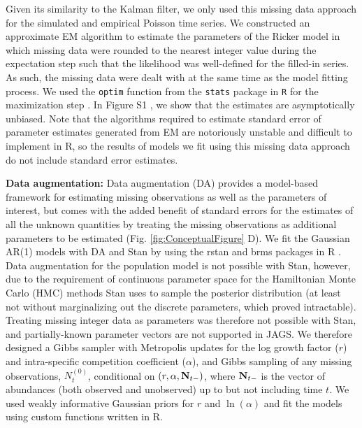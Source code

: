 \documentclass{article}
\begin{document}
Given its similarity to the Kalman filter, we only used this missing data approach for the simulated and empirical Poisson time series. We constructed an approximate EM algorithm to estimate the parameters of the Ricker model in which missing data were rounded to the nearest integer value during the expectation step such that the likelihood was well-defined for the filled-in series. As such, the missing data were dealt with at the same time as the model fitting process. We used the \texttt{optim} function from the \texttt{stats} package in \texttt{R} for the maximization step \citep{r_2021}. In Figure S1%
, we show that the estimates are asymptotically unbiased. Note that the algorithms required to estimate standard error of parameter estimates generated from EM are notoriously unstable and difficult to implement in R, so the results of models we fit using this missing data approach do not include standard error estimates. 


\noindent \textbf{Data augmentation: }Data augmentation (DA) provides a model-based framework for estimating missing observations as well as the parameters of interest, but comes with the added benefit of standard errors for the estimates of all the unknown quantities by treating the missing observations as additional parameters to be estimated (Fig. \ref{fig:ConceptualFigure} D). We fit the Gaussian AR(1) models with DA and Stan \citep{carpenter_stan_2017} by using the rstan \citep{rstan_package} and brms \citep{burkner2017brms} packages in R \citep{r_2021}. Data augmentation for the population model is not possible with Stan, however, due to the requirement of continuous parameter space for the Hamiltonian Monte Carlo (HMC) methods Stan uses to sample the posterior distribution (at least not without marginalizing out the discrete parameters, which proved intractable). Treating missing integer data as parameters was therefore not possible with Stan, and partially-known parameter vectors are not supported in JAGS. We therefore designed a Gibbs sampler with Metropolis updates for the log growth factor ($r$) and intra-specific competition coefficient ($\alpha$), and Gibbs sampling of any missing observations, $N_{t}^{(0)}$, conditional on $(r, \alpha, {\bf N}_{t-})$, where ${\bf N}_{t-}$ is the vector of abundances (both observed and unobserved) up to but not including time $t$. We used weakly informative Gaussian priors for $r$ and $\ln(\alpha)$ and fit the models using custom functions written in R. %
\end{document}
